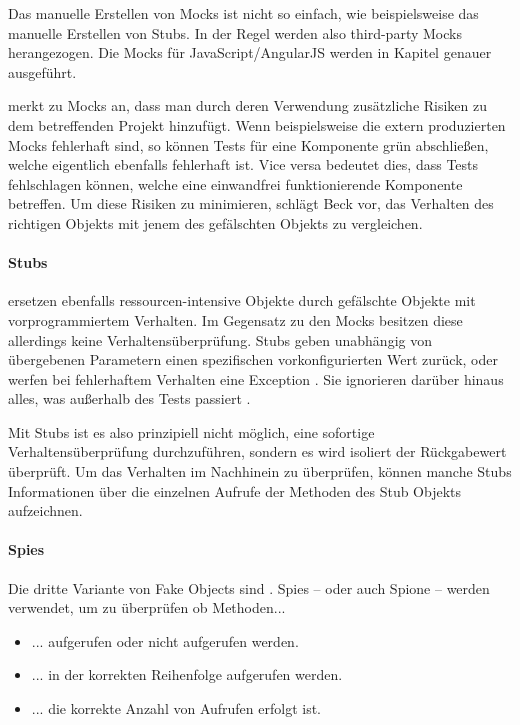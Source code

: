 Das manuelle Erstellen von Mocks ist nicht so einfach, wie beispielsweise das manuelle Erstellen von Stubs. In der Regel werden also third-party Mocks herangezogen. Die Mocks für JavaScript/AngularJS werden in Kapitel  genauer ausgeführt.

\cite[145]{Beck:2003} merkt zu Mocks an, dass man durch deren Verwendung zusätzliche Risiken zu dem betreffenden Projekt hinzufügt. Wenn beispielsweise die extern produzierten Mocks fehlerhaft sind, so können Tests für eine Komponente grün abschließen, welche eigentlich ebenfalls fehlerhaft ist. Vice versa bedeutet dies, dass Tests fehlschlagen können, welche eine einwandfrei funktionierende Komponente betreffen.
Um diese Risiken zu minimieren, schlägt Beck vor, das Verhalten des richtigen Objekts mit jenem des gefälschten Objekts zu vergleichen.

\paragraph{Stubs}
 ersetzen ebenfalls ressourcen-intensive Objekte durch gefälschte Objekte mit vorprogrammiertem Verhalten. Im Gegensatz zu den Mocks besitzen diese allerdings keine Verhaltensüberprüfung. Stubs geben unabhängig von übergebenen Parametern einen spezifischen vorkonfigurierten Wert zurück, oder werfen bei fehlerhaftem Verhalten eine Exception \autocite[443]{Johansen:2011}. Sie ignorieren darüber hinaus alles, was außerhalb des Tests passiert \autocite{Fowler:Mocks}.

Mit Stubs ist es also prinzipiell nicht möglich, eine sofortige Verhaltensüberprüfung durchzuführen, sondern es wird isoliert der Rückgabewert überprüft. Um das Verhalten im Nachhinein zu überprüfen, können manche Stubs Informationen über die einzelnen Aufrufe der Methoden des Stub Objekts aufzeichnen.

\newpage
\paragraph{Spies}
Die dritte Variante von Fake Objects sind . Spies -- oder auch Spione -- werden verwendet, um zu überprüfen ob Methoden...
\begin{itemize}
  \item ... aufgerufen oder nicht aufgerufen werden.
  \item ... in der korrekten Reihenfolge aufgerufen werden.
  \item ... die korrekte Anzahl von Aufrufen erfolgt ist.
\end{itemize}


